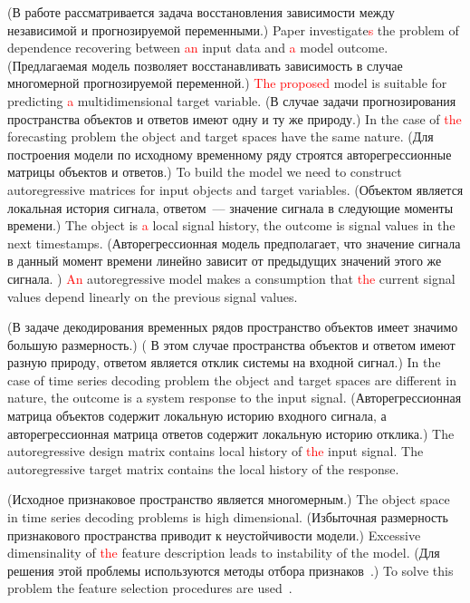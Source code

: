 \documentclass[12pt,twoside]{article}
\begin{document}
(В работе рассматривается задача восстановления зависимости между независимой и прогнозируемой переменными.)
Paper investigate\textcolor{red}{s} the problem of dependence recovering between \textcolor{red}{an} input data and \textcolor{red}{a} model outcome.
(Предлагаемая модель позволяет восстанавливать зависимость в случае многомерной прогнозируемой переменной.)
\textcolor{red}{The proposed} model is suitable for predicting \textcolor{red}{a} multidimensional target variable.
(В случае задачи прогнозирования пространства объектов и ответов имеют одну и ту же природу.)
In the case of \textcolor{red}{the} forecasting problem the object and target spaces have the same nature.
(Для построения модели по исходному временному ряду строятся авторегрессионные матрицы объектов и ответов.)
To build the model we need to construct autoregressive matrices for input objects and target variables.
(Объектом является локальная история сигнала, ответом~--- значение сигнала в следующие моменты времени.)
The object is \textcolor{red}{a} local signal history, the outcome is signal values in the next timestamps.
(Авторегрессионная модель предполагает, что значение сигнала в данный момент времени линейно зависит от предыдущих значений этого же сигнала. )
\textcolor{red}{An} autoregressive model makes a consumption that \textcolor{red}{the} current signal values depend linearly on the previous signal values.

(В задаче декодирования временных рядов пространство объектов имеет значимо большую размерность.)
( В этом случае пространства объектов и ответом имеют разную природу, ответом является отклик системы на входной сигнал.) 
In the case of time series decoding problem the object and target spaces are different in nature, the outcome is a system response to the input signal.
(Авторегрессионная матрица объектов содержит локальную историю входного сигнала, а авторегрессионная матрица ответов содержит локальную историю отклика.)
The autoregressive design matrix contains local history of \textcolor{red}{the}  input signal.
The autoregressive target matrix contains the local history of the response.

(Исходное признаковое пространство является многомерным.) 
The object space in time series decoding problems is high dimensional.
(Избыточная размерность признакового пространства приводит к неустойчивости модели.)
Excessive dimensinality of \textcolor{red}{the} feature description leads to instability of the model.
(Для решения этой проблемы используются методы отбора признаков~\cite{katrutsa2015qpfs,li2016feature}.)
To solve this problem the feature selection procedures are used~\cite{katrutsa2015qpfs,li2016feature}.
\end{document}
